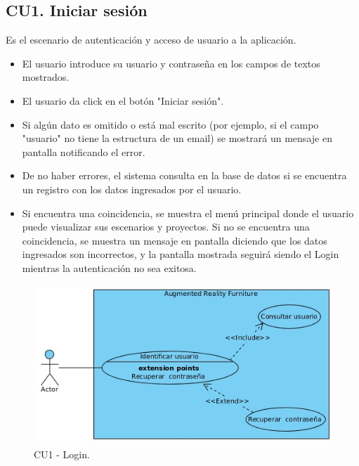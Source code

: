 \subsection{CU1. Iniciar sesión}\par
Es el escenario de autenticación y acceso de usuario a la aplicación. 
\begin{itemize}
	\item El usuario introduce su usuario y contraseña en los campos de textos mostrados.
	\item El usuario da click en el botón "Iniciar sesión".
	\item Si algún dato es omitido o está mal escrito (por ejemplo, si el campo "usuario" no tiene la estructura de un email) se mostrará un mensaje en pantalla notificando el error.
	\item De no haber errores, el sistema consulta en la base de datos si se encuentra un registro con los datos ingresados por el usuario.
	\item Si encuentra una coincidencia, se muestra el menú principal donde el usuario puede visualizar sus escenarios y proyectos. Si no se encuentra una coincidencia, se muestra un mensaje en pantalla diciendo que los datos ingresados son incorrectos, y la pantalla mostrada seguirá siendo el Login mientras la autenticación no sea exitosa.
\end{itemize}
\begin{figure}[h!]
	\centering
	\includegraphics[width=12cm,height=6cm]{imagenes/analisis/login.jpg}
	\caption{CU1 - Login.}
	
	\label{fig:analogo}
\end{figure}  

